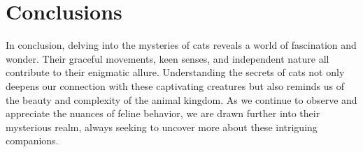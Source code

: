 \chapter{Conclusions}

In conclusion, delving into the mysteries of cats reveals a world of fascination and wonder. Their graceful movements, keen senses, and independent nature all contribute to their enigmatic allure. Understanding the secrets of cats not only deepens our connection with these captivating creatures but also reminds us of the beauty and complexity of the animal kingdom. As we continue to observe and appreciate the nuances of feline behavior, we are drawn further into their mysterious realm, always seeking to uncover more about these intriguing companions.